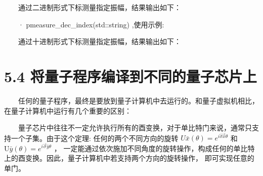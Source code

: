 \documentclass[a4paper,11pt,english]{sphinxmanual}
\begin{document}
\sphinxAtStartPar
  通过二进制形式下标测量指定振幅，结果输出如下：

\begin{sphinxVerbatim}[commandchars=\\\{\}]
 
\end{sphinxVerbatim}

\sphinxAtStartPar
  · pmeasure\_dec\_index(std::string) ,使用示例:

\begin{sphinxVerbatim}[commandchars=\\\{\}]
   
    
\end{sphinxVerbatim}

\sphinxAtStartPar
  通过十进制形式下标测量指定振幅，结果输出如下：

\begin{sphinxVerbatim}[commandchars=\\\{\}]
\end{sphinxVerbatim}

\sphinxstepscope


\section{5.4 将量子程序编译到不同的量子芯片上}
\label{\detokenize{rst/5.4_u5c06_u91cf_u5b50_u7a0b_u5e8f_u7f16_u8bd1_u5230_u4e0d_u540c_u7684_u91cf_u5b50_u82af_u7247_u4e0a:id1}}\label{\detokenize{rst/5.4_u5c06_u91cf_u5b50_u7a0b_u5e8f_u7f16_u8bd1_u5230_u4e0d_u540c_u7684_u91cf_u5b50_u82af_u7247_u4e0a::doc}}
\sphinxAtStartPar
  任何的量子程序，最终是要放到量子计算机中去运行的。和量子虚拟机相比，在量子计算机中运行有几个重要的区别：

\sphinxAtStartPar
{}

\sphinxAtStartPar
  量子芯片中往往不一定允许执行所有的酉变换，对于单比特门来说，通常只支持一个子集。由于这个定理: 任何的两个不同方向的旋转 \({U}{\bar{x}}(\theta)=e^{i \vec{\sigma x} \theta}\) 和  \(\mathrm{U}{\bar{y}}(\theta)=e^{i \vec{\sigma} \bar{y} \theta}\) ， 一定能通过依次施加不同角度的旋转操作，构成任何的单比特上的酉变换。因此，量子计算机中若支持两个方向的旋转操作， 即可实现任意的单门。
\end{document}
